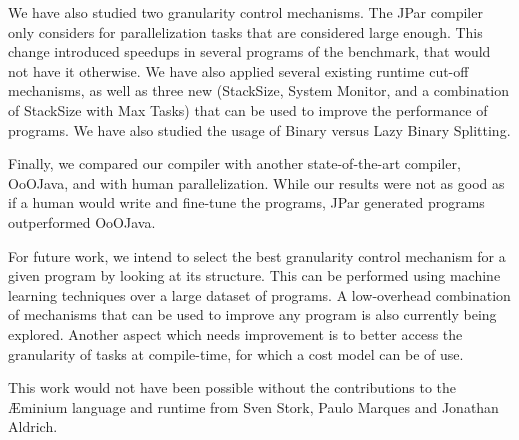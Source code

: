 \documentclass[smallextended]{svjour3}
\begin{document}
We have also studied two granularity control mechanisms. The JPar compiler only considers for parallelization tasks that are considered large enough. This change introduced speedups in several programs of the benchmark, that would not have it otherwise. We have also applied several existing runtime cut-off mechanisms, as well as three new (StackSize, System Monitor, and a combination of StackSize with Max Tasks) that can be used to improve the performance of programs. We have also studied the usage of Binary versus Lazy Binary Splitting.

Finally, we compared our compiler with another state-of-the-art compiler, OoOJava, and with human parallelization. While our results were not as good as if a human would write and fine-tune the programs, JPar generated programs outperformed OoOJava.

For future work, we intend to select the best granularity control mechanism for a given program by looking at its structure. This can be performed using machine learning techniques over a large dataset of programs. A low-overhead combination of mechanisms that can be used to improve any program is also currently being explored. Another aspect which needs improvement is to better access the granularity of tasks at compile-time, for which a cost model can be of use.

\begin{acknowledgements}
This work would not have been possible without the contributions to the Æminium language and runtime from Sven Stork, Paulo Marques and Jonathan Aldrich.
\end{acknowledgements}

      
\end{document}
